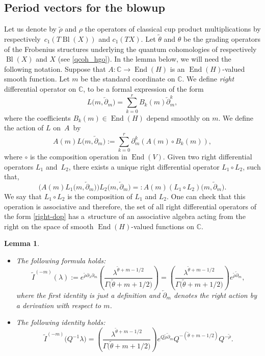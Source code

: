 \documentclass[pdftex]{sigma}
\numberwithin{equation}{section}
\newtheorem{Lemma}[Theorem]{Lemma}
\newcommand{\CC}{\mathbb{C}}
\newcommand{\op}{\operatorname}
\begin{document}
\subsection{Period vectors for the blowup}
Let us denote
by $\widetilde{\rho}$ and $\rho$ the operators of classical cup product
multiplications by respectively~$c_1(T\operatorname{Bl}(X))$ and
$c_1(TX)$. Let $\widetilde{\theta}$ and $\theta$ be the grading
operators of the Frobenius structures underlying the quantum
cohomologies of respectively $\operatorname{Bl}(X)$ and $X$ (see
\eqref{qcoh_hgo}). In the lemma below, we will need the following
notation. Suppose that $A\colon\CC\to \op{End}(H)$ is
an $\op{End}(H)$-valued smooth function. Let $m$ be the standard
coordinate on $\CC$. We define {\em right} differential operator on
$\CC$, to be a formal expression of the form
\begin{equation}\label{right-dop}
L\big(m,\overleftarrow{\partial}_m\big)=
\sum_{k=0}^r B_k(m)
\overleftarrow{\partial}_m^k,
\end{equation}
where the coefficients $B_k(m)\in
\op{End}(H)$ depend smoothly on $m$. We define the action of
$L$ on~$A$~by
\[
A(m) L\big(m,\overleftarrow{\partial}_m\big) := \sum_{k=0}^r \partial_m^k (
 A(m) \circ B_k(m)  ),
\]
where $\circ$ is the composition operation in $\op{End}(V)$. Given two right
differential operators $L_1$ and~$L_2$, there exists a unique right
differential operator $L_1\circ L_2$, such that,
\[
\big(A(m) L_1\big(m,\overleftarrow{\partial}_m\big)\big)
L_2\big(m,\overleftarrow{\partial}_m\big) =:
A(m) (L_1\circ L_2)\big(m,\overleftarrow{\partial}_m\big).
\]
We say that $L_1\circ L_2$ is the composition of $L_1$ and $L_2$. One
can check that this operation is associative and therefore, the set of
all right differential operators of the form \eqref{right-dop} has
a~structure of an associative algebra acting from the right on the
space of smooth $\op{End}(H)$-valued functions on $\CC$.
\begin{Lemma}\label{le:cp-homog}\quad
\begin{itemize}\itemsep=0pt
\item[$(a)$] The following formula holds:
\[
\widetilde{I}^{(-m)}(\lambda) :=
e^{\widetilde{\rho}\partial_\lambda\partial_m}
\left(
\frac{\lambda^{\widetilde{\theta}+m-1/2}}{
\Gamma\big(\widetilde{\theta}+m+1/2\big)} \right) =
\left(
\frac{\lambda^{\widetilde{\theta}+m-1/2}}{
\Gamma\big(\widetilde{\theta}+m+1/2\big)} \right)
e^{\widetilde{\rho} \overleftarrow{\partial}_m},
\]
where the first identity is just a definition and $\overleftarrow{\partial}_m$
denotes the right action by a derivation with respect to $m$.
\item[$(b)$]
The following identity holds:
\[
\widetilde{I}^{(-m)}\big(Q^{-1}\lambda\big) =
\left(
\frac{\lambda^{\widetilde{\theta}+m-1/2}}{
\Gamma\big(\widetilde{\theta}+m+1/2\big)}
\right)
e^{Q\widetilde{\rho} \overleftarrow{\partial}_m}
Q^{-(\widetilde{\theta}+m-1/2)}
Q^{-\widetilde{\rho}}.
\]
\end{itemize}
\end{Lemma}
\end{document}
